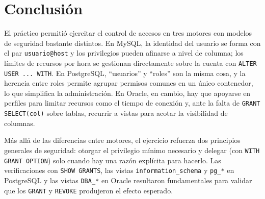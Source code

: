 \documentclass[11pt,a4paper]{article}
\begin{document}
\section{Conclusión}

El práctico permitió ejercitar el control de accesos en tres motores con modelos de seguridad bastante distintos. En MySQL, la identidad del usuario se forma con el par \texttt{usuario@host} y los privilegios pueden afinarse a nivel de columna; los límites de recursos por hora se gestionan directamente sobre la cuenta con \texttt{ALTER USER ... WITH}. En PostgreSQL, ``usuarios'' y ``roles'' son la misma cosa, y la herencia entre roles permite agrupar permisos comunes en un único contenedor, lo que simplifica la administración. En Oracle, en cambio, hay que apoyarse en perfiles para limitar recursos como el tiempo de conexión y, ante la falta de \texttt{GRANT SELECT(col)} sobre tablas, recurrir a vistas para acotar la visibilidad de columnas.

Más allá de las diferencias entre motores, el ejercicio refuerza dos principios generales de seguridad: otorgar el privilegio mínimo necesario y delegar (con \texttt{WITH GRANT OPTION}) solo cuando hay una razón explícita para hacerlo. Las verificaciones con \texttt{SHOW GRANTS}, las vistas \texttt{information\_schema} y \texttt{pg\_*} en PostgreSQL y las vistas \texttt{DBA\_*} en Oracle resultaron fundamentales para validar que los \texttt{GRANT} y \texttt{REVOKE} produjeron el efecto esperado.
\end{document}
